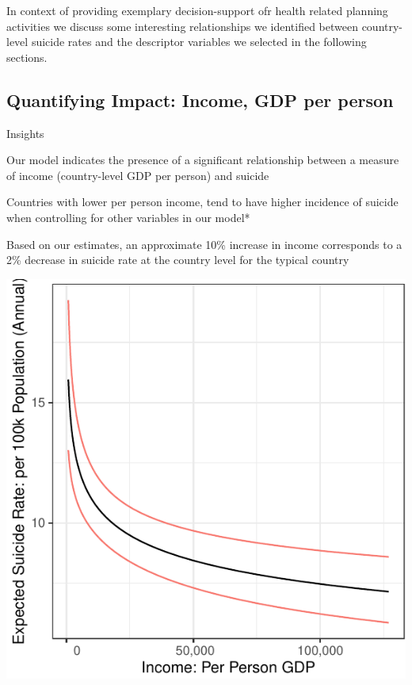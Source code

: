 \documentclass[]{article}
\begin{document}
In context of providing exemplary decision-support ofr health related
planning activities we discuss some interesting relationships we
identified between country-level suicide rates and the descriptor
variables we selected in the following sections.

\subsection{Quantifying Impact: Income, GDP per
person}\label{quantifying-impact-income-gdp-per-person}

Insights

Our model indicates the presence of a significant relationship between a
measure of income (country-level GDP per person) and suicide~

Countries with lower per person income, tend to have higher incidence of
suicide when controlling for other variables in our model*

Based on our estimates, an approximate 10\% increase in income
corresponds to a 2\% decrease in suicide rate at the country level for
the typical country

\begin{center}\includegraphics{Project_Report_files/figure-latex/agdp_plot-1} \end{center}
\end{document}
